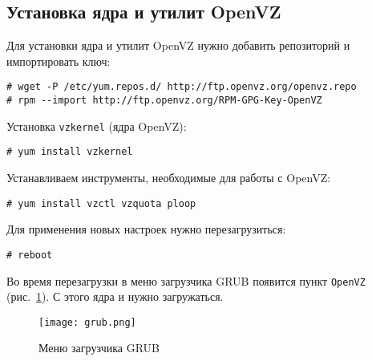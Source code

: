 \subsection{Установка ядра и утилит OpenVZ}
Для установки ядра и утилит OpenVZ нужно добавить репозиторий и импортировать ключ:
\begin{lstlisting}
# wget -P /etc/yum.repos.d/ http://ftp.openvz.org/openvz.repo
# rpm --import http://ftp.openvz.org/RPM-GPG-Key-OpenVZ
\end{lstlisting}

Установка \texttt{vzkernel} (ядра OpenVZ):
\begin{lstlisting}
# yum install vzkernel
\end{lstlisting}

Устанавливаем инструменты, необходимые для работы с OpenVZ:
\begin{lstlisting}
# yum install vzctl vzquota ploop
\end{lstlisting}

Для применения новых настроек нужно перезагрузиться:
\begin{lstlisting}
# reboot
\end{lstlisting}

Во время перезагрузки в меню загрузчика GRUB появится пункт \texttt{OpenVZ} (рис.~\ref{pic:grub}).
С этого ядра и нужно загружаться.
\begin{figure}[ht]
    \centering
	\texttt{[image: grub.png]}
	\caption{Меню загрузчика GRUB}\label{pic:grub}
\end{figure}

\clearpage

